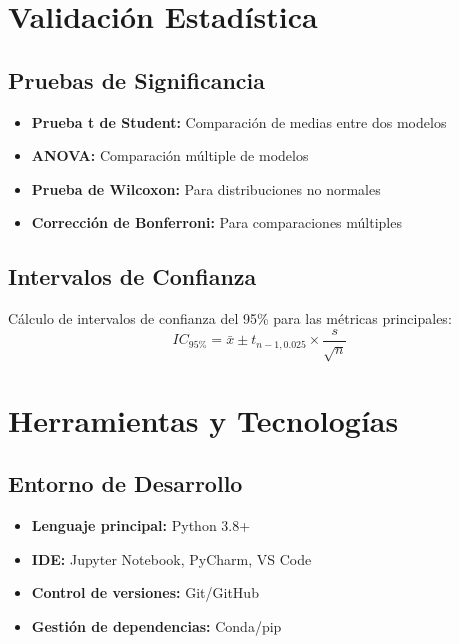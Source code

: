 \section{Validación Estadística}

\subsection{Pruebas de Significancia}

\begin{itemize}
    \item \textbf{Prueba t de Student:} Comparación de medias entre dos modelos
    \item \textbf{ANOVA:} Comparación múltiple de modelos
    \item \textbf{Prueba de Wilcoxon:} Para distribuciones no normales
    \item \textbf{Corrección de Bonferroni:} Para comparaciones múltiples
\end{itemize}

\subsection{Intervalos de Confianza}

Cálculo de intervalos de confianza del 95\% para las métricas principales:
\begin{equation}
IC_{95\%} = \bar{x} \pm t_{n-1,0.025} \times \frac{s}{\sqrt{n}}
\label{eq:intervalo_confianza}
\end{equation}

\section{Herramientas y Tecnologías}

\subsection{Entorno de Desarrollo}

\begin{itemize}
    \item \textbf{Lenguaje principal:} Python 3.8+
    \item \textbf{IDE:} Jupyter Notebook, PyCharm, VS Code
    \item \textbf{Control de versiones:} Git/GitHub
    \item \textbf{Gestión de dependencias:} Conda/pip
\end{itemize}

